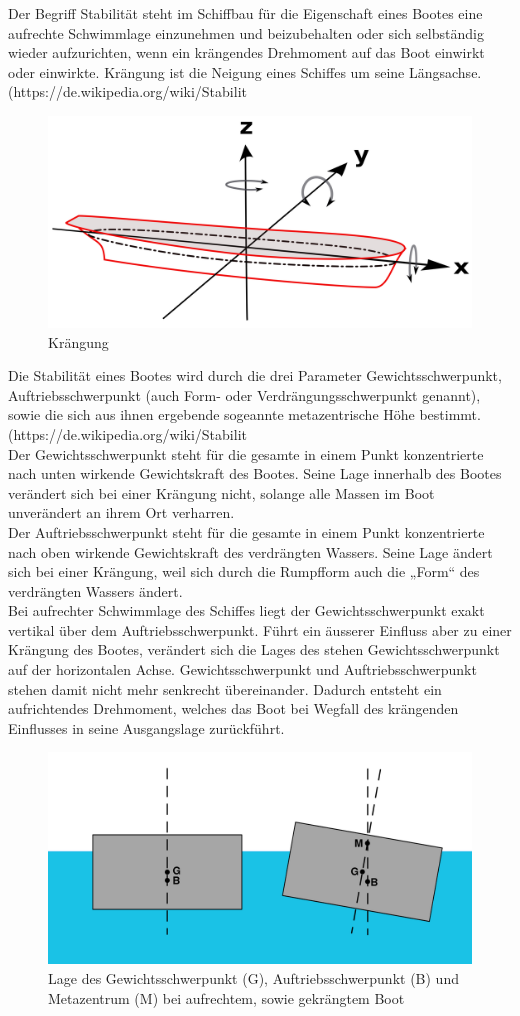 Der Begriff Stabilität steht im Schiffbau für die Eigenschaft eines Bootes eine aufrechte Schwimmlage einzunehmen und beizubehalten oder sich selbständig wieder aufzurichten, wenn ein krängendes Drehmoment auf das Boot einwirkt oder einwirkte. Krängung ist die Neigung eines Schiffes um seine Längsachse. (https://de.wikipedia.org/wiki/Stabilit%
\begin{figure}
    \centering
    \includegraphics[width=0.5\linewidth]{assets/Achsen_Schiffsbewegung.svg.png}
    \caption{Krängung}
    \label{fig:enter-label}
\end{figure}
Die Stabilität eines Bootes wird durch die drei Parameter Gewichtsschwerpunkt, Auftriebsschwerpunkt (auch Form- oder Verdrängungsschwerpunkt genannt), sowie die sich aus ihnen ergebende sogeannte metazentrische Höhe bestimmt. (https://de.wikipedia.org/wiki/Stabilit%
\\Der Gewichtsschwerpunkt steht für die gesamte in einem Punkt konzentrierte nach unten wirkende Gewichtskraft des Bootes. Seine Lage innerhalb des Bootes  verändert sich bei einer Krängung nicht, solange alle Massen im Boot unverändert an ihrem Ort verharren. \\
Der Auftriebsschwerpunkt steht für die gesamte in einem Punkt konzentrierte nach oben wirkende Gewichtskraft des verdrängten Wassers. Seine Lage ändert sich bei einer Krängung, weil sich durch die Rumpfform auch die „Form“ des verdrängten Wassers ändert.\\
Bei aufrechter Schwimmlage des Schiffes liegt der Gewichtsschwerpunkt exakt vertikal über dem Auftriebsschwerpunkt. Führt ein äusserer Einfluss aber zu einer Krängung des Bootes, verändert sich die Lages des  stehen Gewichtsschwerpunkt auf der horizontalen Achse. Gewichtsschwerpunkt und Auftriebsschwerpunkt stehen  damit nicht mehr senkrecht übereinander. Dadurch entsteht ein aufrichtendes Drehmoment, welches das Boot bei Wegfall des krängenden Einflusses in seine Ausgangslage zurückführt. 
\begin{figure}
    \centering
    \includegraphics[width=0.5\linewidth]{Metacentriskhojd-svg.svg.png}
    \caption{Lage des Gewichtsschwerpunkt (G), Auftriebsschwerpunkt (B) und Metazentrum (M) bei aufrechtem, sowie gekrängtem Boot }
    \label{fig:enter-label}
\end{figure}
